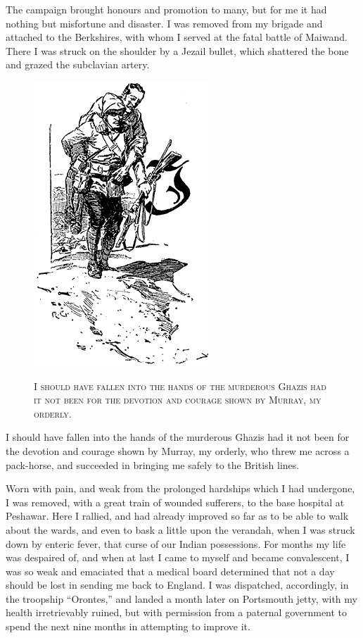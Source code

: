 \documentclass[12pt,english]{book}
\newcommand{\noun}[1]{\textsc{#1}}
\begin{document}
The campaign brought honours and promotion to many, but for me it
had nothing but misfortune and disaster. I was removed from my brigade
and attached to the Berkshires, with whom I served at the fatal battle
of Maiwand. There I was struck on the shoulder by a Jezail bullet,
which shattered the bone and grazed the subclavian artery. %
\begin{figure}[htbp]
\noindent \begin{center}\includegraphics{images/study10-stud-01.png}\end{center}

\noindent \begin{center}\noun{I should have fallen into the hands
of the murderous Ghazis had it not been for the devotion and courage
shown by Murray, my orderly.}\end{center}
\end{figure}
I should have fallen into the hands of the murderous Ghazis had it
not been for the devotion and courage shown by Murray, my orderly,
who threw me across a pack-horse, and succeeded in bringing me safely
to the British lines.

Worn with pain, and weak from the prolonged hardships which I had
undergone, I was removed, with a great train of wounded sufferers,
to the base hospital at Peshawar. Here I rallied, and had already
improved so far as to be able to walk about the wards, and even to
bask a little upon the verandah, when I was struck down by enteric
fever, that curse of our Indian possessions. For months my life was
despaired of, and when at last I came to myself and became convalescent,
I was so weak and emaciated that a medical board determined that not
a day should be lost in sending me back to England. I was dispatched,
accordingly, in the troopship {}``Orontes,'' and landed a month
later on Portsmouth jetty, with my health irretrievably ruined, but
with permission from a paternal government to spend the next nine
months in attempting to improve it.
\end{document}
